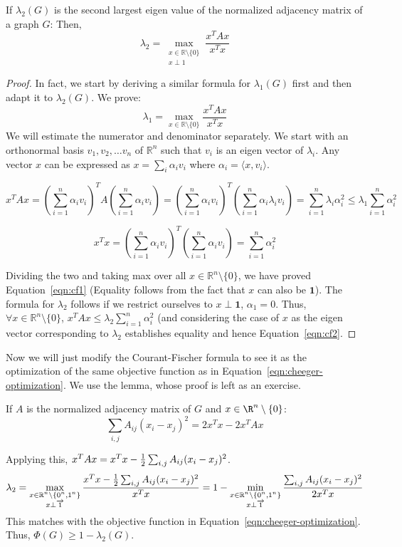 \begin{lemma}
If $\lambda_2(G)$ is the second largest eigen value of the normalized adjacency matrix of a graph $G$: Then,
\begin{equation}
\lambda_2 = \max_{\substack{x \in \mathbb{R}\setminus\{0\}\\x\perp 1}} \frac{x^TAx}{x^Tx}
\label{eqn:cf2}
\end{equation}
\end{lemma}
\begin{proof}
In fact, we start by deriving a similar formula for $\lambda_1(G)$ first and then adapt it to $\lambda_2(G)$. We prove:
\begin{equation}
\lambda_1 = \max_{x \in \mathbb{R}\setminus\{0\}} \frac{x^TAx}{x^Tx}
\label{eqn:cf1}
\end{equation}
We will estimate the numerator and denominator separately. We start with an orthonormal basis $v_1, v_2, \ldots v_n$ of $\mathbb{R}^n$ such that $v_i$ is an eigen vector of $\lambda_i$. Any vector $x$ can be expressed as $x = \sum_i \alpha_i v_i$ where $\alpha_i = \langle x,v_i \rangle$.

$$ x^TAx = \left(\sum_{i=1}^n \alpha_iv_i\right)^T A \left(\sum_{i=1}^n \alpha_i v_i \right) = \left(\sum_{i=1}^n \alpha_iv_i\right)^T \left(\sum_{i=1}^n \alpha_i \lambda_iv_i \right) = \sum_{i=1}^n \lambda_i \alpha_i^2  \le \lambda_1 \sum_{i=1}^n  \alpha_i^2 $$

$$ x^Tx = \left(\sum_{i=1}^n \alpha_iv_i\right)^T \left(\sum_{i=1}^n \alpha_i v_i \right) = \sum_{i=1}^n \alpha_i^2$$

Dividing the two and taking max over all $x \in \mathbb{R}^n\setminus\{0\}$, we have proved Equation~\ref{eqn:cf1} (Equality follows from the fact that $x$ can also be $\textbf{1}$). The formula for $\lambda_2$ follows if we restrict ourselves to $x \perp \textbf{1}$, $\alpha_1 = 0$. Thus, $\forall x \in \mathbb{R}^n \setminus \{0\}$, $x^TAx \le \lambda_2 \sum_{i=1}^n  \alpha_i^2$ (and considering the case of $x$ as the eigen vector corresponding to $\lambda_2$ establishes equality and hence Equation~\ref{eqn:cf2}.
\end{proof}

Now we will just modify the Courant-Fischer formula to see it as the optimization of the same objective function as in Equation~\ref{eqn:cheeger-optimization}. We use the lemma, whose proof is left as an exercise.
\begin{exercise}
If $A$ is the normalized adjacency matrix of $G$ and $x \in \R^n\setminus\{0\}$:
$$\sum_{i,j} A_{ij}(x_i-x_j)^2 = 2x^Tx - 2x^TAx$$
\end{exercise}
Applying this, $x^TAx = x^Tx - \frac{1}{2} \sum_{i,j} A_{ij}(x_i-x_j)^2$.
$$\lambda_2 = \max_{\substack{
x \in \mathbb{R}^n\setminus \{0^n,1^n\}\\
x \perp \mathbf{\overrightarrow{1}}}}
\frac{x^Tx - \frac{1}{2}\sum_{i,j}A_{ij}(x_i-x_j)^2}{x^Tx} = 1-\min_{\substack{
x \in \mathbb{R}^n\setminus \{0^n,1^n\}\\
x \perp \mathbf{\overrightarrow{1}}}}
\frac{\sum_{i,j}A_{ij}(x_i-x_j)^2}{2x^Tx}$$
This matches with the objective function in Equation~\ref{eqn:cheeger-optimization}. Thus, $\Phi(G) \ge 1-\lambda_2(G)$.

